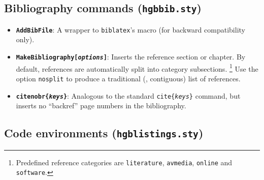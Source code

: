 \documentclass[english]{hgbarticle}
\begin{document}
\subsection{Bibliography commands (\texttt{hgbbib.sty})}



\begin{itemize}
\item
\textbf{\texttt{{\bs}AddBibFile}}: A wrapper to \texttt{biblatex}'s \verb!! macro
(for backward compatibility only).
\item
\textbf{\texttt{{\bs}MakeBibliography[\emph{options}]}}: Inserts the reference section or chapter.
By default, references are automatically split into category subsections.%
\footnote{Predefined reference categories are \texttt{literature}, \texttt{avmedia}, \texttt{online}
and \texttt{software}.}
Use the option \texttt{nosplit} to produce a traditional (\ie, contiguous) list of references.
\item
\textbf{\texttt{{\bs}citenobr\{\emph{keys}\}}}: Analogous to the standard \texttt{{\bs}cite\{\emph{keys}\}} command, but inserts no ``backref'' page numbers in the bibliography.
\end{itemize}



\subsection{Code environments (\texttt{hgblistings.sty})}
\end{document}
